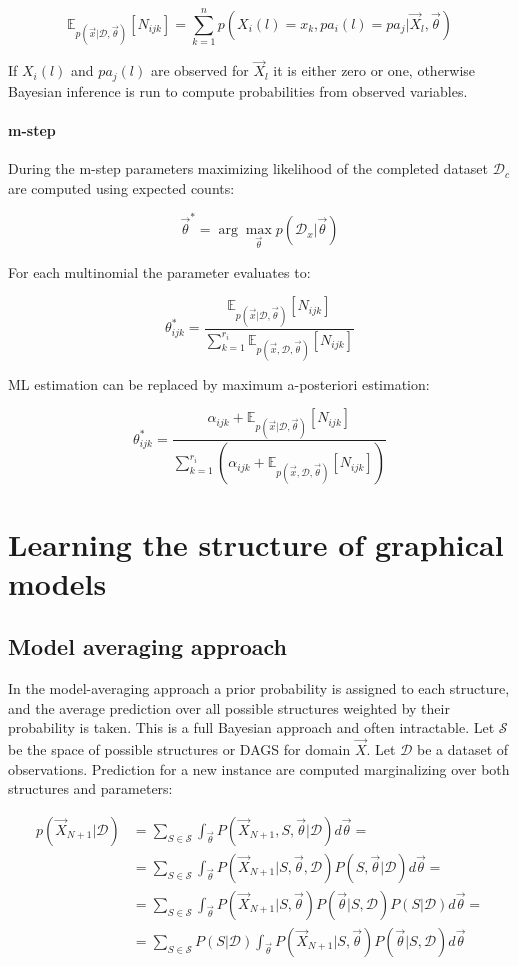 			$$\mathbb{E}_{p(\vec{x}|\mathcal{D},\vec{\theta})}[N_{ijk}] = \sum\limits_{k=1}^np(X_i(l) = x_k, pa_i(l) = pa_j|\vec{X}_l, \vec{\theta})$$

			If $X_i(l)$ and $pa_j(l)$ are observed for $\vec{X}_l$ it is either zero or one, otherwise Bayesian inference is run to compute probabilities from observed variables.

			\paragraph{m-step}
			During the m-step parameters maximizing likelihood of the completed dataset $\mathcal{D}_c$ are computed using expected counts:

			$$\vec{\theta}^* = \arg\max\limits_{\vec{\theta}}p(\mathcal{D}_x|\vec{\theta})$$

			For each multinomial the parameter evaluates to:

			$$\theta^*_{ijk} = \frac{\mathbb{E}_{p(\vec{x}|\mathcal{D},\vec{\theta})}[N_{ijk}]}{\sum\limits_{k=1}^{r_i}\mathbb{E}_{p(\vec{x}, \mathcal{D},\vec{\theta})}[N_{ijk}]}$$

			ML estimation can be replaced by maximum a-posteriori estimation:

			$$\theta^*_{ijk} = \frac{\alpha_{ijk} + \mathbb{E}_{p(\vec{x}|\mathcal{D},\vec{\theta})}[N_{ijk}]}{\sum\limits_{k=1}^{r_i}(\alpha_{ijk} + \mathbb{E}_{p(\vec{x}, \mathcal{D},\vec{\theta})}[N_{ijk}])}$$

\section{Learning the structure of graphical models}

	\subsection{Model averaging approach}
	In the model-averaging approach a prior probability is assigned to each structure, and the average prediction over all possible structures weighted by their probability is taken.
	This is a full Bayesian approach and often intractable.
	Let $\mathcal{S}$ be the space of possible structures or DAGS for domain $\vec{X}$.
	Let $\mathcal{D}$ be a dataset of observations.
	Prediction for a new instance are computed marginalizing over both structures and parameters:

	\begin{align*}
		p(\vec{X}_{N+1}|\mathcal{D}) &= \sum\limits_{S\in\mathcal{S}} \int_{\vec{\theta}} P(\vec{X}_{N+1}, S, \vec{\theta}|\mathcal{D})d\vec{\theta}=\\
																&=\sum\limits_{S\in\mathcal{S}}\int_{\vec{\theta}}P(\vec{X}_{N+1}|S, \vec{\theta}, \mathcal{D})P(S, \vec{\theta}|\mathcal{D})d\vec{\theta}=\\
																&=\sum\limits_{S\in\mathcal{S}}\int_{\vec{\theta}} P(\vec{X}_{N+1}|S, \vec{\theta})P(\vec{\theta}|S, \mathcal{D})P(S|\mathcal{D})d\vec{\theta}=\\
																&=\sum\limits_{S\in\mathcal{S}}P(S|\mathcal{D})\int_{\vec{\theta}}P(\vec{X}_{N+1}|S, \vec{\theta})P(\vec{\theta}|S, \mathcal{D})d\vec{\theta}
	\end{align*}

